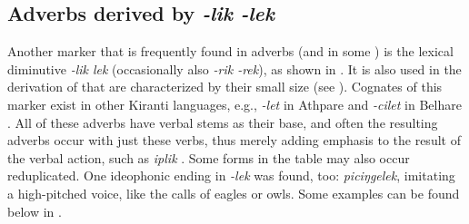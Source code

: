     
\subsection{Adverbs derived by  \emph{-lik \ti -lek}}

Another marker that is frequently found  in adverbs (and in some ) is the lexical diminutive \emph{-lik \ti lek} (occasionally also \emph{-rik \ti \mbox{-rek}}), as shown in . It is also used in the derivation of  that are characterized by their small size (see ). Cognates of this marker exist in other Kiranti languages, e.g., \emph{-let} in Athpare \cite{Ebert1997A-grammar} and \emph{-cilet} in Belhare  \citep{Bickel2003Belhare}. All of these adverbs have verbal stems as their base, and often the resulting adverbs occur with just these verbs, thus merely adding  emphasis to the result of the verbal action, such as \emph{iplik} . Some forms in the table may also occur reduplicated. One ideophonic  ending in \emph{-lek} was found, too: \emph{piciŋgelek}, imitating a high-pitched voice, like the calls of eagles or owls. Some examples can be found below in \Next.



